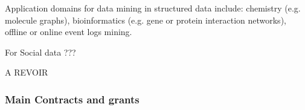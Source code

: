 Application domains for data mining in structured data include: chemistry (e.g. molecule graphs), bioinformatics (e.g. gene or protein interaction networks), offline or online event logs mining.

For Social data  ???  

A REVOIR 

\subsubsection{Main Contracts and grants}



